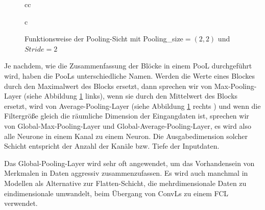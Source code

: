 \documentclass[12pt,a4paper]{scrartcl}
\numberwithin{equation}{section}
\def\Arrow{\raisebox{3\height}{\scalebox{1}{$\xRightarrow[.]{.}$}}}
\begin{document}
\begin{figure}[h!]
\begin{tabular}{cc}
\begin{tabular}{c}
\Arrow
				
			\end{tabular}

		
	\end{tabular}
			\caption{Funktionsweise der Pooling-Sicht mit Pooling\_size$ =(2,2) $ und $ Stride =2$}
			\label{fig:Pooling}
\end{figure}

Je nachdem, wie die Zusammenfassung der Blöcke in einem \ac{PooL} durchgeführt wird, haben die \acsp{PooL} unterschiedliche Namen. Werden die Werte eines Blockes durch den Maximalwert des Blocks ersetzt, dann sprechen wir von Max-Pooling-Layer (siehe Abbildung \ref{fig:Pooling} links), wenn sie durch den Mittelwert  des Blocks ersetzt, wird von Average-Pooling-Layer (siehe Abbildung \ref{fig:Pooling} rechts ) und wenn die Filtergröße gleich die räumliche Dimension der Eingangdaten ist, sprechen wir von Global-Max-Pooling-Layer und Global-Average-Pooling-Layer, es wird also alle Neurone in einem Kanal zu einem Neuron. Die Ausgabedimension solcher Schicht entspricht der Anzahl der Kanäle bzw. Tiefe der Inputdaten.

Das Global-Pooling-Layer wird sehr oft angewendet, um das Vorhandensein von Merkmalen in Daten aggressiv zusammenzufassen. Es wird auch manchmal in Modellen als Alternative zur Flatten-Schicht, die mehrdimensionale Daten zu eindimensionale umwandelt, beim Übergang von \acsp{ConvL} zu einem \ac{FCL}  verwendet.
\end{document}
